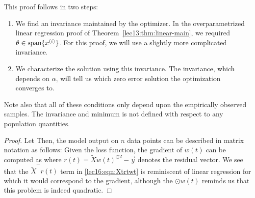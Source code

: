 This proof follows in two steps:
\begin{enumerate}
\item We find an invariance maintained by the optimizer. In the overparametrized linear regression proof of Theorem~\ref{lec13:thm:linear-main}, we required $\theta \in \text{span}\{x\sp{i}\}$.  For this proof, we will use a slightly more complicated invariance.
\item We characterize the solution using this invariance.  The invariance, which depends on $\alpha$, will tell us which zero error solution the optimization converges to.
\end{enumerate}
Note also that all of these conditions only depend upon the empirically observed samples. The invariance and minimum is not defined with respect to any population quantities.
\begin{proof}  
Let
Then, the model output on $n$ data points can be described in matrix notation as follows:
Given the loss function,
the gradient of $w(t)$ can be computed as
where $r(t) = \tilde{X} w(t)^{\odot 2} - \vec{y}$ denotes the residual vector.  We see that the $\tilde{X}^\top r(t)$ term in \eqref{lec16:eqn:Xtrtwt} is reminiscent of linear regression for which it would correspond to the gradient, although the $\odot w(t)$ reminds us that this problem is indeed quadratic.


\end{proof}
